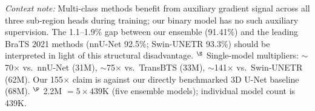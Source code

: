 \begin{table}[htbp]
\begin{center}
\end{center}
{\footnotesize \textit{Context note:} Multi-class methods benefit from auxiliary gradient signal across all three sub-region heads during training; our binary model has no such auxiliary supervision. The 1.1--1.9\% gap between our ensemble (91.41\%) and the leading BraTS 2021 methods (nnU-Net 92.5\%; Swin-UNETR 93.3\%) should be interpreted in light of this structural disadvantage.
$^\S$ Single-model multipliers: $\sim$70$\times$ vs.\ nnU-Net (31M), $\sim$75$\times$ vs.\ TransBTS (33M), $\sim$141$\times$ vs.\ Swin-UNETR (62M). Our 155$\times$ claim is against our directly benchmarked 3D U-Net baseline (68M).
$^\P$ 2.2M $= 5 \times 439\text{K}$ (five ensemble models); individual model count is 439K.}
\end{table}


